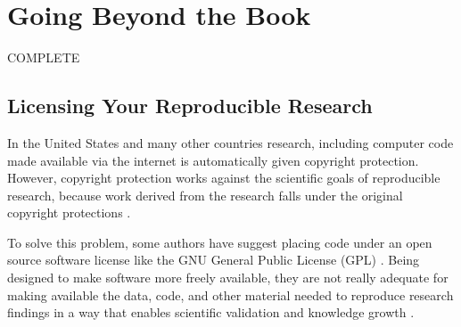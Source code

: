 



\chapter{Going Beyond the Book}\label{FinalChapter}

COMPLETE

\section{Licensing Your Reproducible Research}

In the United States and many other countries research, including computer code made available via the internet is automatically given copyright protection. However, copyright protection works against the scientific goals of reproducible research, because work derived from the research falls under the original copyright protections \cite[36]{Stodden2009}. 

To solve this problem, some authors have suggest placing code under an open source software license like the GNU General Public License (GPL) \cite[]{Vandewalle2007}. Being designed to make software more freely available, they are not really adequate for making available the data, code, and other material needed to reproduce research findings in a way that enables scientific validation and knowledge growth \cite[see][]{Stodden2009}. 
